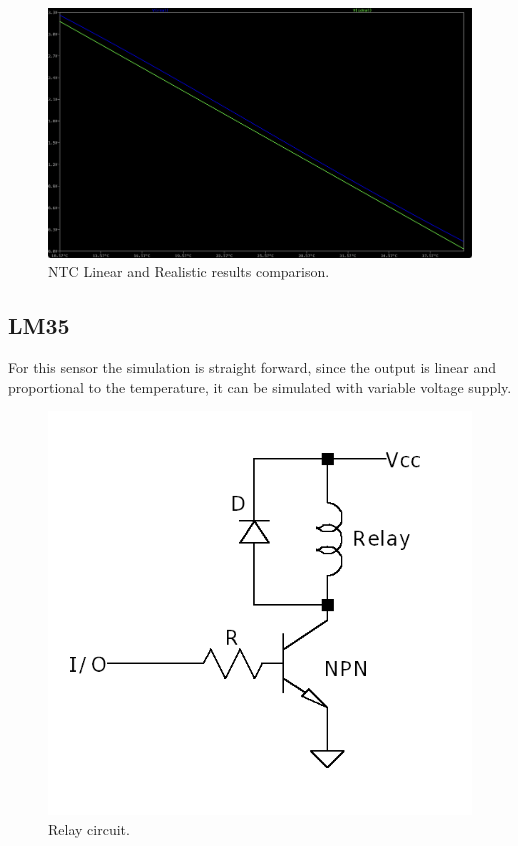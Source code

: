\documentclass[12pt]{article}
\begin{document}
    \begin{figure}[H] 
        \centering
        \includegraphics*[scale = 0.3]{images/NTCRealLinearComp.png}
        \caption{NTC Linear and Realistic results comparison.}
        \label{wrap-fig:1}
    \end{figure}


\subsection{LM35}

    For this sensor the simulation is straight forward, since the output is linear and proportional to the temperature, 
    it can be simulated with variable voltage supply. 

    \begin{figure}[H] 
        \centering
        \includegraphics*[scale = 0.4]{images/RelayDrive.png}
        \caption{Relay circuit.}
        \label{wrap-fig:1}
    \end{figure}
    
\end{document}
